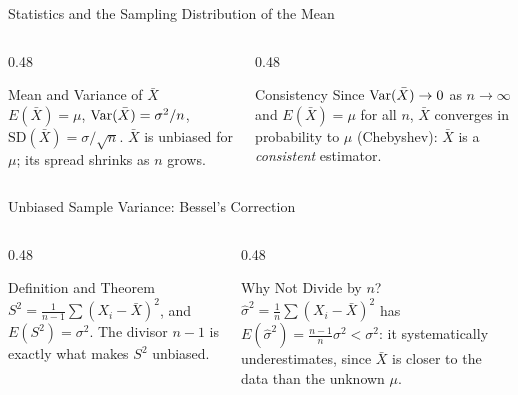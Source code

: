 \documentclass[aspectratio=169,xcolor={dvipsnames,table}]{beamer}
\begin{document}
\begin{frame}{Statistics and the Sampling Distribution of the Mean}
	\vspace{-0.15cm}
	\begin{columns}[T]
		\begin{column}{0.48\textwidth}
			\begin{block}{Mean and Variance of $\bar{X}$}
				\footnotesize
				$E(\bar{X})=\mu$, $\operatorname{Var}(\bar{X})=\sigma^2/n$, $\text{SD}(\bar{X})=\sigma/\sqrt{n}$. $\bar{X}$ is unbiased for $\mu$; its spread shrinks as $n$ grows.
			\end{block}
		\end{column}
		\begin{column}{0.48\textwidth}
			\begin{alertblock}{Consistency}
				\footnotesize
				Since $\operatorname{Var}(\bar{X})\to 0$ as $n\to\infty$ and $E(\bar{X})=\mu$ for all $n$, $\bar{X}$ converges in probability to $\mu$ (Chebyshev): $\bar{X}$ is a \emph{consistent} estimator.
			\end{alertblock}
		\end{column}
	\end{columns}
\end{frame}

\begin{frame}{Unbiased Sample Variance: Bessel's Correction}
	\vspace{-0.15cm}
	\begin{columns}[T]
		\begin{column}{0.48\textwidth}
			\begin{block}{Definition and Theorem}
				\footnotesize
				$S^2 = \frac{1}{n-1}\sum(X_i-\bar{X})^2$, and $E(S^2)=\sigma^2$. The divisor $n-1$ is exactly what makes $S^2$ unbiased.
			\end{block}
		\end{column}
		\begin{column}{0.48\textwidth}
			\begin{alertblock}{Why Not Divide by $n$?}
				\footnotesize
				$\hat{\sigma}^2=\frac{1}{n}\sum(X_i-\bar{X})^2$ has $E(\hat{\sigma}^2)=\frac{n-1}{n}\sigma^2 < \sigma^2$: it systematically underestimates, since $\bar{X}$ is closer to the data than the unknown $\mu$.
			\end{alertblock}
		\end{column}
	\end{columns}
\end{frame}
\end{document}
